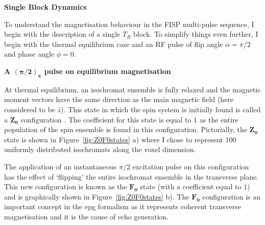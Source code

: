 \hfill

\large \textbf{Single Block Dynamics} \normalsize 

To understand the magnetisation behaviour in the FISP multi-pulse sequence, I begin with the description of a single $T_R$ block.
To simplify things even further, I begin with the thermal equilibrium case and an RF pulse of flip angle $\alpha = \pi/2$ and phase angle $\phi = 0$.

\hfill

\textbf{A $\bm{(\pi/2)_x}$ pulse on equilibrium magnetisation}

At thermal equilibrium, an isochromat ensemble is fully relaxed and the magnetic moment vectors have the same direction as the main magnetic field (here considered to be $\hat{z}$).
This state in which the spin system is initially found is called a $\bm{Z_0}$ configuration \cite{Weigel2015} \cite{Scheffler1999} \cite{Hennig1991}.
The coefficient for this state is equal to $1$ as the entire population of the spin ensemble is found in this configuration.
Pictorially, the $\bm{Z_0}$ state is shown in Figure~\ref{fig:Z0F0states} a) where I chose to represent 100 uniformly distributed isochromats along the voxel dimension.

\hfill

The application of an instantaneous $\pi/2$ excitation pulse on this configuration has the effect of `flipping' the entire isochromat ensemble in the transverse plane.
This new configuration is known as the $\bm{F_0}$ state \cite{Weigel2015} \cite{Scheffler1999} \cite{Hennig1991} (with a coefficient equal to $1$) and is graphically shown in Figure~\ref{fig:Z0F0states} b).
The $\bm{F_0}$ configuration is an important concept in the \ac{epg} formalism as it represents coherent transverse magnetisation and it is the cause of echo generation.

